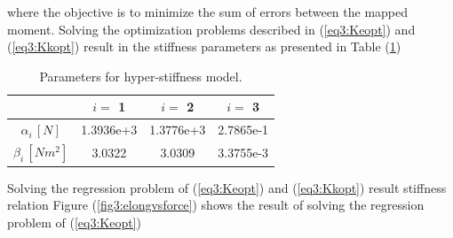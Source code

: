 where the objective is to minimize the sum of errors between the mapped moment. Solving the optimization problems described in (\ref{eq3:Keopt}) and (\ref{eq3:Kkopt}) result in the stiffness parameters as presented in Table (\ref{tab3:stiffnessparameters})

\begin{table}[H]
    \centering
        \caption{Parameters for hyper-stiffness model.}
\begin{tabular}{|c|c|c|c|} \hline
            &  $i = $ 1      &    $i = $    2   &  $i = $ 3  \\ \hline
   $\alpha_i \hspace{2pt}[N]$    &    1.3936e+3    & 1.3776e+3    & 2.7865e-1 \\ \hline
   $\beta_i \hspace{2pt}  [Nm^2] $     &  3.0322 & 3.0309    &  3.3755e-3\\ \hline
\end{tabular}
    \label{tab3:stiffnessparameters}
\end{table}

Solving the regression problem of (\ref{eq3:Keopt}) and (\ref{eq3:Kkopt}) result stiffness relation
Figure (\ref{fig3:elongvsforce}) shows the result of solving the regression problem of (\ref{eq3:Keopt})


